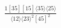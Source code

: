 \documentclass[varwidth, border=5pt]{standalone}
\begin{document}
\begin{my}
$\begin{gathered}
\scriptscriptstyle\frac{1[35][15]⟨35⟩⟨25⟩}{⟨12⟩⟨23⟩^2[45]^2}
\end{gathered}$
\end{my}
\end{document}
